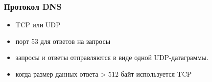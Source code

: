 
\begin{frame}[fragile]
  \frametitle{Протокол DNS}
\begin{itemize}
  \item TCP или UDP
  \item \alert{порт 53} для ответов на запросы
  \item запросы и ответы отправляются в виде одной \alert{UDP}-датаграммы. 
  \item когда размер данных ответа > 512 байт используется \alert{TCP}
\end{itemize}

\end{frame}
